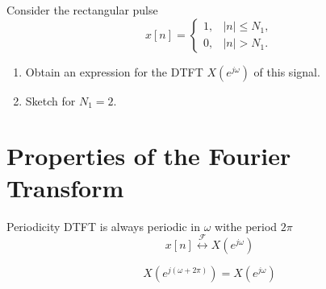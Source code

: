 \begin{frame}
    {
        \begin{figure}
            \centering
            
        \end{figure}

    }
\end{frame}


\begin{frame}
    \begin{example}
        Consider the rectangular pulse
        \begin{equation*}
            x[n] = \begin{cases}
                1, & |n| \leq N_1,\\
                0, & |n| > N_1.
            \end{cases}
        \end{equation*}
        \begin{enumerate}
            \item Obtain an expression for the DTFT $X(e^{j\omega})$ of this signal.
            \item Sketch for $N_1 = 2$.
        \end{enumerate}
     \end{example}

        \begin{figure}
            \centering
            
        \end{figure}

\end{frame}



\begin{frame}

    \begin{figure}
        \centering
        
    \end{figure}
\end{frame} 

\section{Properties of the Fourier Transform}

\begin{frame}{Periodicity}
    DTFT is always periodic in $\omega$ withe period $2\pi$
    \begin{equation*}
        x[n] \overset{\mathcal{F}}{\leftrightarrow} X(e^{j\omega})
    \end{equation*}

    \begin{equation*}
        X\left(e^{j(\omega+2\pi)}\right) = X(e^{j\omega})
    \end{equation*}
\end{frame}


